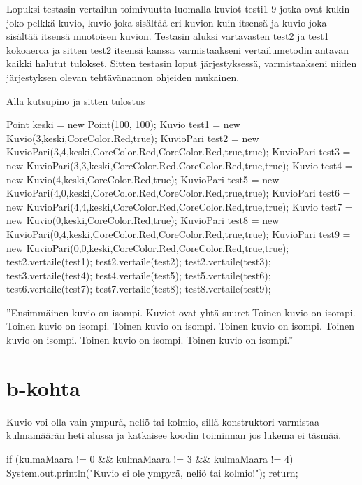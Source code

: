 Lopuksi testasin vertailun toimivuutta luomalla kuviot testi1-9 jotka ovat kukin
joko pelkkä kuvio, kuvio joka sisältää eri kuvion kuin itsensä ja kuvio joka sisältää
itsensä muotoisen kuvion. Testasin aluksi vartavasten test2 ja test1 kokoaeroa ja
sitten test2 itsensä kanssa varmistaakseni vertailumetodin antavan kaikki halutut
tulokset. Sitten testasin loput järjestyksessä, varmistaakseni niiden järjestyksen
olevan tehtävänannon ohjeiden mukainen.

Alla kutsupino ja sitten tulostus
\begin{javacode}
      Point keski = new Point(100, 100);
      Kuvio test1 = new Kuvio(3,keski,CoreColor.Red,true);
      KuvioPari test2 = new KuvioPari(3,4,keski,CoreColor.Red,CoreColor.Red,true,true);
      KuvioPari test3 = new KuvioPari(3,3,keski,CoreColor.Red,CoreColor.Red,true,true);
      Kuvio test4 = new Kuvio(4,keski,CoreColor.Red,true);
      KuvioPari test5 = new KuvioPari(4,0,keski,CoreColor.Red,CoreColor.Red,true,true);
      KuvioPari test6 = new KuvioPari(4,4,keski,CoreColor.Red,CoreColor.Red,true,true);
      Kuvio test7 = new Kuvio(0,keski,CoreColor.Red,true);
      KuvioPari test8 = new KuvioPari(0,4,keski,CoreColor.Red,CoreColor.Red,true,true);
      KuvioPari test9 = new KuvioPari(0,0,keski,CoreColor.Red,CoreColor.Red,true,true);
      test2.vertaile(test1);
      test2.vertaile(test2);
      test2.vertaile(test3);
      test3.vertaile(test4);
      test4.vertaile(test5);
      test5.vertaile(test6);
      test6.vertaile(test7);
      test7.vertaile(test8);
      test8.vertaile(test9);
      
''Ensimmäinen kuvio on isompi.
  Kuviot ovat yhtä suuret
  Toinen kuvio on isompi.
  Toinen kuvio on isompi.
  Toinen kuvio on isompi.
  Toinen kuvio on isompi.
  Toinen kuvio on isompi.
  Toinen kuvio on isompi.
  Toinen kuvio on isompi.''
\end{javacode}

\section{b-kohta}
\label{b-kohta}
Kuvio voi olla vain ympurä, neliö tai kolmio, sillä konstruktori varmistaa
kulmamäärän heti alussa ja katkaisee koodin toiminnan jos lukema ei täsmää.
\begin{javacode}
    if (kulmaMaara != 0 && kulmaMaara != 3 && kulmaMaara != 4) {
      System.out.println("Kuvio ei ole ympyrä, neliö tai kolmio!");
      return;
    }
\end{javacode}


